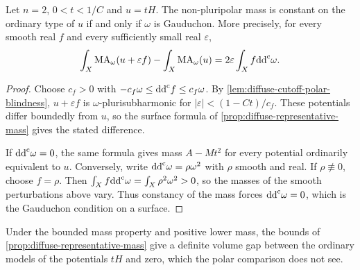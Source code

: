 \begin{corollary}\label{cor:diffuse-surface-mass-invariance}
Let $n=2$, $0<t<1/C$ and $u=tH$. The non-pluripolar mass is constant on the ordinary type of $u$ if and only if $\omega$ is Gauduchon. More precisely, for every smooth real $f$ and every sufficiently small real $\varepsilon$,
\[
 \int_X\mathrm{MA}_\omega(u+\varepsilon f)
       -\int_X\mathrm{MA}_\omega(u)
       =2\varepsilon\int_Xf\mathrm{dd}^{\mathrm{c}}\omega.
\]
\end{corollary}
\begin{proof}
Choose $c_f>0$ with $-c_f\omega\leq\mathrm{dd}^{\mathrm{c}} f\leq c_f\omega$. By \cref{lem:diffuse-cutoff-polar-blindness}, $u+\varepsilon f$ is $\omega$-plurisubharmonic for $|\varepsilon|<(1-Ct)/c_f$. These potentials differ boundedly from $u$, so the surface formula of \cref{prop:diffuse-representative-mass} gives the stated difference.

If $\mathrm{dd}^{\mathrm{c}}\omega=0$, the same formula gives mass $A-Mt^2$ for every potential ordinarily equivalent to $u$. Conversely, write $\mathrm{dd}^{\mathrm{c}}\omega=\rho\omega^2$ with $\rho$ smooth and real. If $\rho\not\equiv0$, choose $f=\rho$. Then $\int_Xf\mathrm{dd}^{\mathrm{c}}\omega=\int_X\rho^2\omega^2>0$, so the masses of the smooth perturbations above vary. Thus constancy of the mass forces $\mathrm{dd}^{\mathrm{c}}\omega=0$, which is the Gauduchon condition on a surface.
\end{proof}

Under the bounded mass property and positive lower mass, the bounds of \cref{prop:diffuse-representative-mass} give a definite volume gap between the ordinary models of the potentials $tH$ and zero, which the polar comparison does not see.

